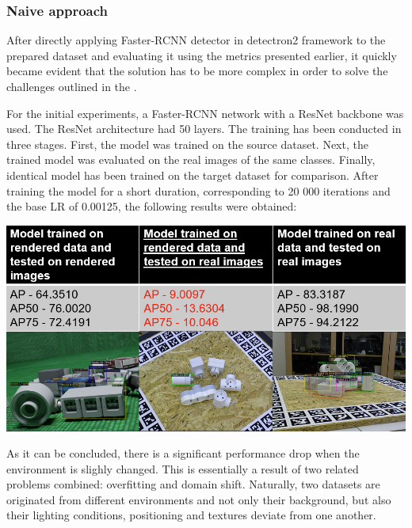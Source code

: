 \documentclass[english, 12pt, a4paper, elec, utf8, a-1b, online]{aaltothesis}
\begin{document}
\subsubsection{Naive approach}
\label{naive} 
After directly applying Faster-RCNN detector\cite{ima} in detectron2 \cite{wu2019detectron2} framework to the prepared dataset and evaluating it using the metrics presented earlier, it quickly became evident that the solution has to be more complex in order to solve the challenges outlined in the . 

For the initial experiments, a Faster-RCNN network with a ResNet backbone was used. The ResNet architecture had 50 layers. The training has been conducted in three stages. First, the model was trained on the source dataset. Next, the trained model was evaluated on the real images of the same classes. Finally, identical model has been trained on the target dataset for comparison. After training the model for a short duration, corresponding to 20 000 iterations and the base LR of 0.00125, the following results were obtained: 

\begin{table}[htb]
	\begin{center}
		\includegraphics[width=14cm]{./initialExp.png}
	\end{center}
	\begin{center}
		\label{faster_init}
	\end{center}
\end{table}
\FloatBarrier

As it can be concluded, there is a significant performance drop when the environment is slighly changed. This is essentially a result of two related problems combined: overfitting and domain shift. Naturally, two datasets are originated from different environments and not only their background, but also their lighting conditions, positioning and textures deviate from one another. 
\end{document}
